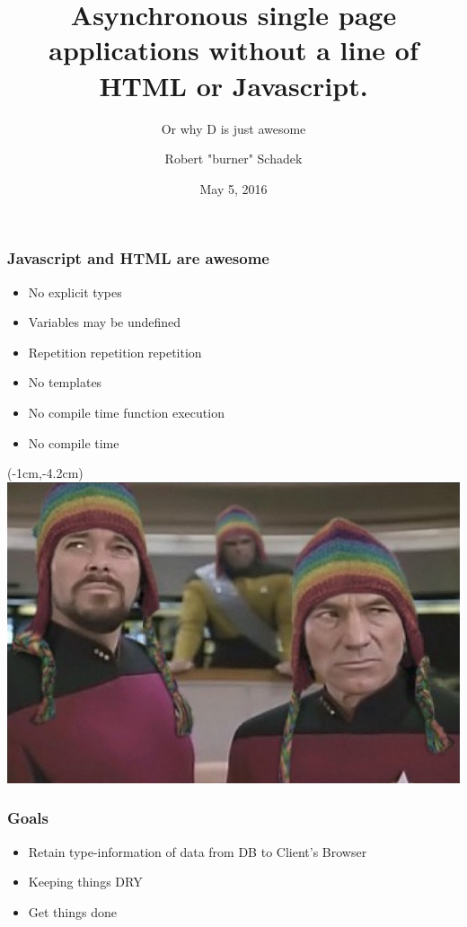 \documentclass[xelatex,13pt]{beamer}
\title{Asynchronous single page applications without a line of HTML or
Javascript.}
\subtitle{Or why D is just awesome}
\author{Robert "burner" Schadek}
\date{May 5, 2016}
\institute{DConf}
\begin{document}
\maketitle

\begin{frame}
	\frametitle{Javascript and HTML are \textbf{awesome}}
	\begin{itemize}
		\item No explicit types
		\item Variables may be undefined
		\item Repetition repetition repetition
		\item No templates
		\item No compile time function execution
			\pause
		\item No compile time
	\end{itemize}
\end{frame}


\begin{frame}[plain]
\begin{textblock*}{0cm}(-1cm,-4.2cm)
	\includegraphics[width=1.0\paperwidth]{picardriker.jpg}
\end{textblock*}
\end{frame}

\begin{frame}
	\frametitle{Goals}	
	\begin{itemize}
		\item Retain type-information of data from DB to Client's Browser
			\pause
		\item Keeping things DRY	
			\pause
		\item Get things done
	\end{itemize}
\end{frame}
\end{document}

